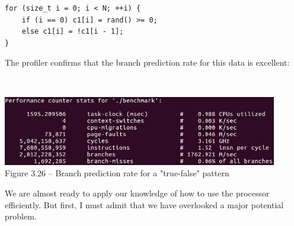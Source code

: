\begin{lstlisting}[style=styleCXX]
for (size_t i = 0; i < N; ++i) {
	if (i == 0) c1[i] = rand() >= 0;
	else c1[i] = !c1[i - 1];
}
\end{lstlisting}

The profiler confirms that the branch prediction rate for this data is excellent:

\hspace*{\fill} \\ %
\begin{center}
\includegraphics[width=0.9\textwidth]{content/1/chapter3/images/26.jpg}\\
Figure 3.26 – Branch prediction rate for a "true-false" pattern
\end{center}

We are almost ready to apply our knowledge of how to use the processor efficiently. But first, I must admit that we have overlooked a major potential problem. 
































